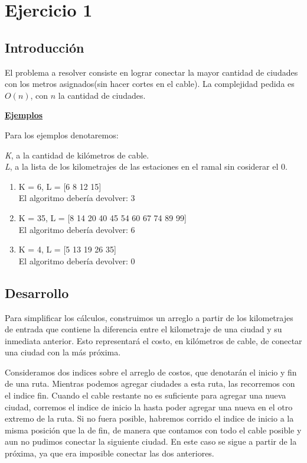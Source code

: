 
\section{Ejercicio 1}
\subsection{Introducción}

El problema a resolver consiste en lograr conectar la mayor cantidad de ciudades con los metros asignados(sin hacer cortes en el cable). La complejidad pedida es $O(n)$, con $n$ la cantidad de ciudades.

\underline{\textbf{Ejemplos}}

Para los ejemplos denotaremos:

\emph{K}, a la cantidad de kilómetros de cable.\\
\emph{L}, a la lista de los kilometrajes de las estaciones en el ramal sin cosiderar el 0.


\begin{enumerate}
\item 
K = 6, L = [6 8 12 15]\\
El algoritmo debería devolver: 3

\item
K = 35, L = [8 14 20 40 45 54 60 67 74 89 99]\\
El algoritmo debería devolver: 6

\item
K = 4, L = [5 13 19 26 35]\\
El algoritmo debería devolver: 0

\end{enumerate}

\subsection{Desarrollo}

Para simplificar los cálculos, construimos un arreglo a partir de los kilometrajes de entrada que contiene la diferencia entre el kilometraje de una ciudad y su inmediata anterior. Esto representará el costo, en kilómetros de cable, de conectar una ciudad con la más próxima.

Consideramos dos indices sobre el arreglo de costos, que denotarán el inicio y fin de una ruta.
Mientras podemos agregar ciudades a esta ruta, las recorremos con el indice fin.
Cuando el cable restante no es suficiente para agregar una nueva ciudad, corremos el indice de inicio la hasta poder agregar una nueva en el otro extremo de la ruta.
Si no fuera posible, habremos corrido el indice de inicio a la misma posición que la de fin, de manera que contamos con todo el cable posible y aun no pudimos conectar la siguiente ciudad. 
En este caso se sigue a partir de la próxima, ya que era imposible conectar las dos anteriores.

